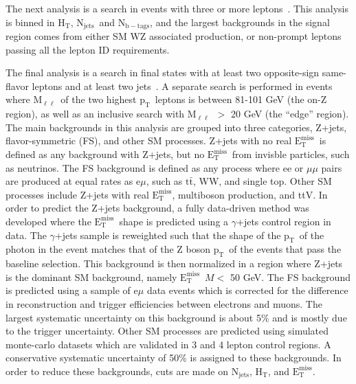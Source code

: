 \documentclass{article}
\newcommand{\MET}{${\mathrm{E_{T}^{miss}}}$}
\newcommand{\pt}{${\mathrm{p_{T}}}$}
\newcommand{\ttbar}{${\mathrm{t\bar{t}}}$}
\newcommand{\HT}{$\mathrm{H_T}$}
\newcommand{\njets}{$\mathrm{N_{jets}}$}
\newcommand{\nbtags}{$\mathrm{N_{b-tags}}$}
\newcommand{\mll}{$\mathrm{M_{\ell\ell}}$}
\begin{document}


The next analysis is a search in events with three or more leptons~\cite{multilep2015}.
This analysis is binned in \HT, \njets\ and \nbtags,
and the largest backgrounds in the signal region comes from either SM WZ associated production,
or non-prompt leptons passing all the lepton ID requirements.

The final analysis is a search in final states with at least two opposite-sign same-flavor leptons and at least two jets~\cite{osdilep2015}.
A separate search is performed in events where \mll\ of the two highest \pt\ leptons is between 81-101 GeV (the on-Z region),
as well as an inclusive search with \mll\ $>$ 20 GeV (the ``edge'' region).
The main backgrounds in this analysis are grouped into three categories, Z+jets, flavor-symmetric (FS), and other SM processes.
Z+jets with no real \MET\ is defined as any background with Z+jets, but no \MET\ from invisble particles, such as neutrinos.
The FS background is defined as any process where ee or $\mu\mu$ pairs are produced at equal rates as e$\mu$,
such as \ttbar, WW, and single top.
Other SM processes include Z+jets with real \MET, multiboson production, and ttV.
In order to predict the Z+jets background, a fully data-driven method was developed where the \MET\ shape is predicted using a $\gamma$+jets control region in data.
The $\gamma$+jets sample is reweighted such that the shape of the \pt\ of the photon in the event matches that of the Z boson \pt\ of the events that pass the baseline selection.
This background is then normalized in a region where Z+jets is the dominant SM background, namely \MET\ $M<$ 50 GeV.
The FS background is predicted using a sample of e$\mu$ data events which is corrected for the difference in reconstruction and trigger efficiencies between electrons and muons.
The largest systematic uncertainty on this background is about 5\% and is mostly due to the trigger uncertainty.
Other SM processes are predicted using simulated monte-carlo datasets which are validated in 3 and 4 lepton control regions.
A conservative systematic uncertainty of 50\% is assigned to these backgrounds.
In order to reduce these backgrounds, cuts are made on \njets, \HT, and \MET.
\end{document}
